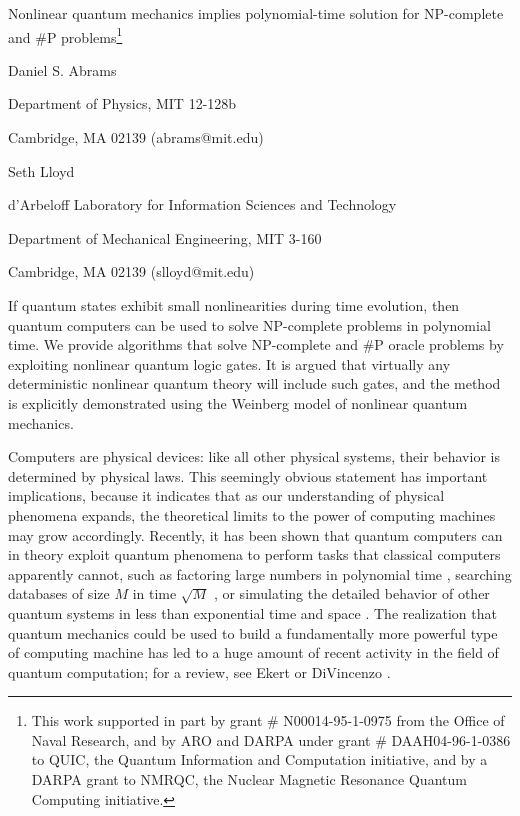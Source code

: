 \documentclass[12pt]{article}
\begin{document}
\begin{center}
{\Large Nonlinear quantum mechanics implies polynomial-time solution for
NP-complete and \#P problems}\footnote{This work supported in part by grant \#
N00014-95-1-0975 from the Office of Naval Research, and by ARO and DARPA under
grant \# DAAH04-96-1-0386 to QUIC, the Quantum Information and Computation
initiative, and by a DARPA grant to NMRQC, the Nuclear Magnetic Resonance
Quantum Computing initiative.}

\bigskip\medskip

Daniel S. Abrams

Department of Physics, MIT 12-128b

Cambridge, MA 02139 (abrams@mit.edu)

\medskip\medskip

Seth Lloyd

d'Arbeloff Laboratory for Information Sciences and Technology

Department of Mechanical Engineering, MIT 3-160

Cambridge, MA 02139 (slloyd@mit.edu)

\medskip\medskip
\end{center}

If quantum states exhibit small nonlinearities during time evolution, then
quantum computers can be used to solve NP-complete problems in polynomial
time. We provide algorithms that solve NP-complete and \#P oracle problems by
exploiting nonlinear quantum logic gates. It is argued that virtually any
deterministic nonlinear quantum theory will include such gates, and the method
is explicitly demonstrated using the Weinberg model of nonlinear quantum
mechanics.\bigskip\bigskip\bigskip\pagebreak 

Computers are physical devices: like all other physical systems, their
behavior is determined by physical laws. This seemingly obvious statement has
important implications, because it indicates that as our understanding of
physical phenomena expands, the theoretical limits to the power of computing
machines may grow accordingly. Recently, it has been shown that quantum
computers can in theory exploit quantum phenomena to perform tasks that
classical computers apparently cannot, such as factoring large numbers in
polynomial time \cite{Shor}, searching databases of size $M$ in time $\sqrt{M}$
\cite{Grover}, or simulating the detailed behavior of other quantum systems in
less than exponential time and space \cite{Feynman}\cite{Lloyd}\cite{Abrams}.
The realization that quantum mechanics could be used to build a fundamentally
more powerful type of computing machine has led to a huge amount of recent
activity in the field of quantum computation; for a review, see
Ekert \cite{Ekert} or DiVincenzo \cite{DiVincenzo}.
\end{document}
